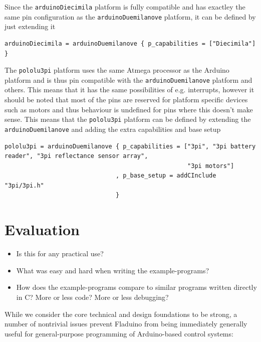 \documentclass[a4paper, oneside, final]{memoir}
\begin{document}
Since the \texttt{arduinoDiecimila} platform is fully compatible and has
exactley the same pin configuration as the \texttt{arduinoDuemilanove} platform, it can
be defined by just extending it

\begin{verbatim}
arduinoDiecimila = arduinoDuemilanove { p_capabilities = ["Diecimila"] }
\end{verbatim}

The \texttt{pololu3pi} platform uses the same Atmega processor as the Arduino
platform and is thus pin compatible with the \texttt{arduinoDuemilanove}
platform and others. This means that it has the same possibilities of e.g.
interrupts, however it should be noted that most of the pins are reserved
\cite{3pi_pin_mapping} for platform specific devices such as motors and thus
behaviour is undefined for pins where this doesn't make sense. This means that
the \texttt{pololu3pi} platform can be defined by extending the
\texttt{arduinoDuemilanove} and adding the extra capabilities and base setup

\begin{verbatim}
pololu3pi = arduinoDuemilanove { p_capabilities = ["3pi", "3pi battery reader", "3pi reflectance sensor array",
                                                   "3pi motors"]
                               , p_base_setup = addCInclude "3pi/3pi.h"
                               }
\end{verbatim}


\chapter{Evaluation}
\label{chap:evaluation}

\begin{itemize}
\item Is this for any practical use?
\item What was easy and hard when writing the example-programs?
\item How does the example-programs compare to similar programs
  written directly in C? More or less code? More or less debugging?
\end{itemize}

While we consider the core technical and design foundations to be
strong, a number of nontrivial issues prevent Fladuino from being
immediately generally useful for general-purpose programming of
Arduino-based control systems:
\end{document}

